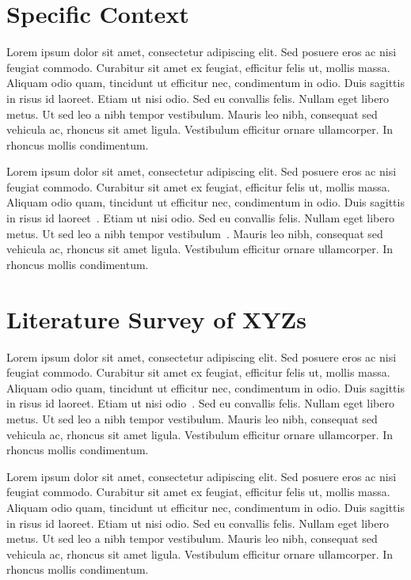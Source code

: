 
\section{Specific Context}
\label{sec:specific_context}

Lorem ipsum dolor sit amet, consectetur adipiscing elit. Sed posuere eros ac nisi feugiat commodo. Curabitur sit amet ex feugiat, efficitur felis ut, mollis massa. Aliquam odio quam, tincidunt ut efficitur nec, condimentum in odio. Duis sagittis in risus id laoreet. Etiam ut nisi odio. Sed eu convallis felis. Nullam eget libero metus. Ut sed leo a nibh tempor vestibulum. Mauris leo nibh, consequat sed vehicula ac, rhoncus sit amet ligula. Vestibulum efficitur ornare ullamcorper. In rhoncus mollis condimentum. \newline

Lorem ipsum dolor sit amet, consectetur adipiscing elit. Sed posuere eros ac nisi feugiat commodo. Curabitur sit amet ex feugiat, efficitur felis ut, mollis massa. Aliquam odio quam, tincidunt ut efficitur nec, condimentum in odio. Duis sagittis in risus id laoreet~\cite{Lampson1973aa}. Etiam ut nisi odio. Sed eu convallis felis. Nullam eget libero metus. Ut sed leo a nibh tempor vestibulum~\cite{Kemmerer1983aa}. Mauris leo nibh, consequat sed vehicula ac, rhoncus sit amet ligula. Vestibulum efficitur ornare ullamcorper. In rhoncus mollis condimentum. \newline


\section{Literature Survey of XYZs}
\label{sec:literature_survey}

Lorem ipsum dolor sit amet, consectetur adipiscing elit. Sed posuere eros ac nisi feugiat commodo. Curabitur sit amet ex feugiat, efficitur felis ut, mollis massa. Aliquam odio quam, tincidunt ut efficitur nec, condimentum in odio. Duis sagittis in risus id laoreet. Etiam ut nisi odio~\cite{Goguen1982aa}. Sed eu convallis felis. Nullam eget libero metus. Ut sed leo a nibh tempor vestibulum. Mauris leo nibh, consequat sed vehicula ac, rhoncus sit amet ligula. Vestibulum efficitur ornare ullamcorper. In rhoncus mollis condimentum. \newline

Lorem ipsum dolor sit amet, consectetur adipiscing elit. Sed posuere eros ac nisi feugiat commodo. Curabitur sit amet ex feugiat, efficitur felis ut, mollis massa. Aliquam odio quam, tincidunt ut efficitur nec, condimentum in odio. Duis sagittis in risus id laoreet. Etiam ut nisi odio. Sed eu convallis felis. Nullam eget libero metus. Ut sed leo a nibh tempor vestibulum. Mauris leo nibh, consequat sed vehicula ac, rhoncus sit amet ligula. Vestibulum efficitur ornare ullamcorper. In~\cite{Nagatou2006aa} rhoncus mollis condimentum. \newline

